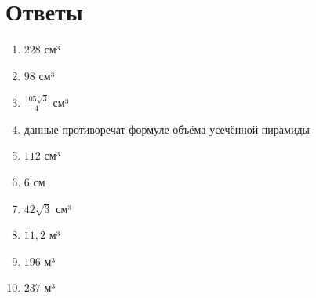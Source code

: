 \documentclass{umk-matematika}
\begin{document}
\newpage
\section*{Ответы}

\begin{enumerate}
  \item $228$ см³
  \item $98$ см³
  \item $\frac{105\sqrt{3}}{4}$ см³
  \item данные противоречат формуле объёма усечённой пирамиды
  \item $112$ см³
  \item $6$ см
  \item $42\sqrt{3}$ см³
  \item $11{,}2$ м³
  \item $196$ м³
  \item $237$ м³
\end{enumerate}
\end{document}
